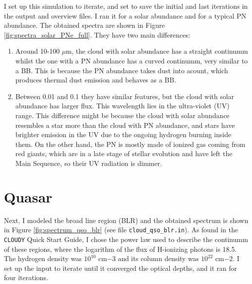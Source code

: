 \documentclass[letterpaper, oneside]{article}
\begin{document}
I set up this simulation to iterate, and set to save the initial and last iterations in the output and overview files. I ran it for a solar abundance and for a typical PN abundance. The obtained spectra are shown in Figure \ref{fig:spectra_solar_PNe_full}. They have two main differences:
\begin{enumerate}
	\item Around 10-100 $\mu$m, the cloud with solar abundance has a straight continumm whilst the one with a PN abundance has a curved continumm, very similar to a BB. This is because the PN abundance takes dust into acount, which produces thermal dust emission and behaves as a BB.
	
	\item Between 0.01 and 0.1 they have similar features, but the cloud with solar abundance has larger flux. This wavelength lies in the ultra-violet (UV) range. This difference might be because the cloud with solar abundance resembles a star more than the cloud with PN abundance, and stars have brighter emission in the UV due to the ongoing hydrogen burning inside them. On the other hand, the PN is mostly made of ionized gas coming from red giants, which are in a late stage of stellar evolution and have left the Main Sequence, so their UV radiation is dimmer.
	
\end{enumerate}




\section{Quasar}

Next, I modeled the broad line region (BLR) and the obtained spectrum is shown in Figure \ref{fig:spectrum_qso_blr} (see file \texttt{cloud\_qso\_blr.in}). As found in the \texttt{CLOUDY} Quick Start Guide, I chose the power law used to describe the continumm of these regions, where the logarithm of the flux of H-ionizing photons is 18.5. The hydrogen density was $10^10$ cm${-3}$ and its column density was $10^22$ cm${-2}$. I set up the input to iterate until it converged the optical depths, and it ran for four iterations.
\end{document}
